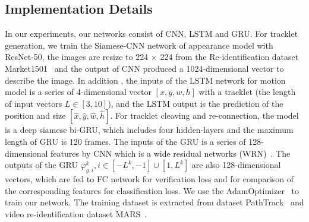 \documentclass[5pt]{article}
\begin{document}
\subsection{Implementation Details}
\vspace{-0.1cm}
In our experiments, our networks consist of CNN, LSTM and GRU. For tracklet generation, we train the Siamese-CNN network of appearance model with ResNet-50, the images are resize to 224 $\times$ 224 from the Re-identification dataset Market1501~\cite{zheng2015scalable} and the output of CNN produced a 1024-dimensional vector to describe the image. In addition , the inputs of
the LSTM network for motion model is a series of 4-dimensional vector $[x, y, w, h]$ with a tracklet (the length of input vectors $L\in[3,10]$), and the LSTM output is the prediction of the position and size $[\hat{x},\hat{y}, \hat{w}, \hat{h}]$.
For tracklet cleaving and re-connection, the model is a deep siamese bi-GRU, which includes four hidden-layers and the maximum length of GRU is 120 frames. The inputs of the GRU is a series of 128-dimensional features by CNN which
is a wide residual networks (WRN)~\cite{zagoruyko2016wide}. The outputs of the GRU $\varphi_{g,i}^k, i\in[-L^k,-1]\cup[1,L^k]$ are also 128-dimensional vectors, which are fed to FC network for verification loss and for comparison of the corresponding features for
classification loss. We use the AdamOptimizer~\cite{kingma2014adam} to train our network. The training dataset is extracted from dataset PathTrack~\cite{manen2017pathtrack} and video re-identification dataset MARS~\cite{zheng2016mars}.
\vspace{-0.1cm}
\end{document}
